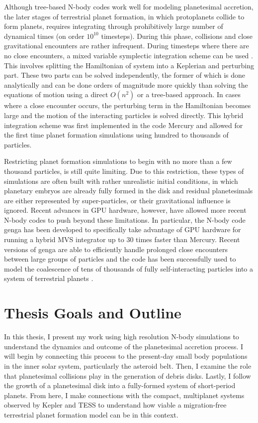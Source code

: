Although tree-based N-body codes work well for modeling planetesimal accretion, the later stages of terrestrial planet formation, in which protoplanets collide to form planets, requires integrating through prohibitively large number of dynamical times (on order $10^{10}$ timesteps). During this phase, collisions and close gravitational encounters are rather infrequent. During timesteps where there are no close encounters, a mixed variable symplectic integration scheme can be used \cite{wisdom91}. This involves splitting the Hamiltonian of system into a Keplerian and perturbing part. These two parts can be solved independently, the former of which is done analytically and can be done orders of magnitude more quickly than solving the equations of motion using a direct $O(n^{2})$ or a tree-based approach. In cases where a close encounter occurs, the perturbing term in the Hamiltonian becomes large and the motion of the interacting particles is solved directly. This hybrid integration scheme was first implemented in the code {\sc Mercury} \cite{chambers99} and allowed for the first time planet formation simulations using hundred to thousands of particles.

 Restricting planet formation simulations to begin with no more than a few thousand particles, is still quite limiting. Due to this restriction, these types of simulations are often built with rather unrealistic initial conditions, in which planetary embryos are already fully formed in the disk and residual planetesimals are either represented by super-particles, or their gravitational influence is ignored. Recent advances in GPU hardware, however, have allowed more recent N-body codes to push beyond these limitations. In particular, the N-body code {\sc genga} \cite{grimm14, grimm22} has been developed to specifically take advantage of GPU hardware for running a hybrid MVS integrator up to 30 times faster than {\sc Mercury}. Recent versions of genga are able to efficiently handle prolonged close encounters between large groups of particles and the code has been successfully used to model the coalescence of tens of thousands of fully self-interacting particles into a system of terrestrial planets \cite{woo21}.

\section{Thesis Goals and Outline}

In this thesis, I present my work using high resolution N-body simulations to understand the dynamics and outcome of the planetesimal accretion process. I will begin by connecting this process to the present-day small body populations in the inner solar system, particularly the asteroid belt. Then, I examine the role that planetesimal collisions play in the generation of debris disks. Lastly, I follow the growth of a planetesimal disk into a fully-formed system of short-period planets. From here, I make connections with the compact, multiplanet systems observed by Kepler and TESS to understand how viable a migration-free terrestrial planet formation model can be in this context.

